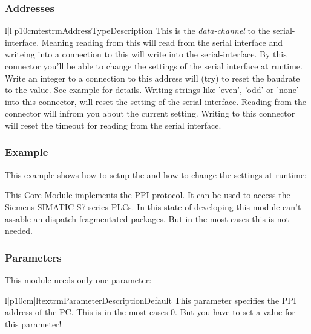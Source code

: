 \subsubsection{Addresses}
\begin{tableiii}{l|l|p{10cm}}{testrm}{Address}{Type}{Description}
\lineiii{---}
        {}
        {This is the \emph{data-channel} to the serial-interface. Meaning 
         reading from this will read from the serial interface and writeing
         into a connection to this will write into the serial-interface.}
        {}
        {By this connector you'll be able to change the settings of the serial
         interface at runtime. Write an integer to a connection to this address
         will (try) to reset the baudrate to the value. See example for details.}
        {}
        {Writing strings like 'even', 'odd' or 'none' into this connector, will
         reset the setting of the serial interface. Reading from the connector
         will infrom you about the current setting.}
        {}
        {Writing to this connector will reset the timeout for reading from 
         the serial interface.}
\end{tableiii}

\subsubsection{Example}
This example shows how to setup the  and how to change the 
settings at runtime:













%
%



%
%
This Core-Module implements the PPI protocol. It can be used to access the Siemens
SIMATIC S7 series PLCs. In this state of developing this module can't assable an
dispatch fragmentated packages. But in the most cases this is not needed. 

\subsubsection{Parameters}
This module needs only one parameter:
\begin{tableiii}{l|p{10cm}|l}{textrm}{Parameter}{Description}{Default}
        {This parameter specifies the PPI address of the PC. This is in the 
         most cases 0. But you have to set a value for this parameter!}
        {}
\end{tableiii}


